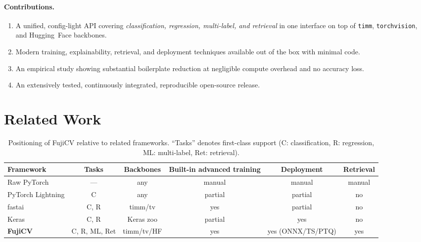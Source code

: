 \documentclass[11pt]{article}
\begin{document}
\paragraph{Contributions.}
\begin{enumerate}
  \item A unified, config-light API covering \emph{classification, regression,
  multi-label, and retrieval} in one interface on top of \texttt{timm},
  \texttt{torchvision}, and Hugging~Face backbones.
  \item Modern training, explainability, retrieval, and deployment techniques
  available out of the box with minimal code.
  \item An empirical study showing substantial boilerplate reduction at
  negligible compute overhead and no accuracy loss.
  \item An extensively tested, continuously integrated, reproducible
  open-source release.
\end{enumerate}

\section{Related Work}
\label{sec:related}

\begin{table}[t]
\centering
\caption{Positioning of FujiCV relative to related frameworks. ``Tasks'' denotes
first-class support (C: classification, R: regression, ML: multi-label, Ret:
retrieval).}
\label{tab:comparison}
\small
\begin{tabular}{lccccc}
\toprule
Framework & Tasks & Backbones & Built-in advanced training & Deployment & Retrieval \\
\midrule
Raw PyTorch          & ---        & any            & manual         & manual        & manual \\
PyTorch Lightning    & C          & any            & partial        & partial       & no     \\
fastai               & C, R       & timm/tv        & yes            & partial       & no     \\
Keras                & C, R       & Keras zoo      & partial        & yes           & no     \\
\textbf{FujiCV}      & C, R, ML, Ret & timm/tv/HF  & yes            & yes (ONNX/TS/PTQ) & yes \\
\bottomrule
\end{tabular}
\end{table}
\end{document}
